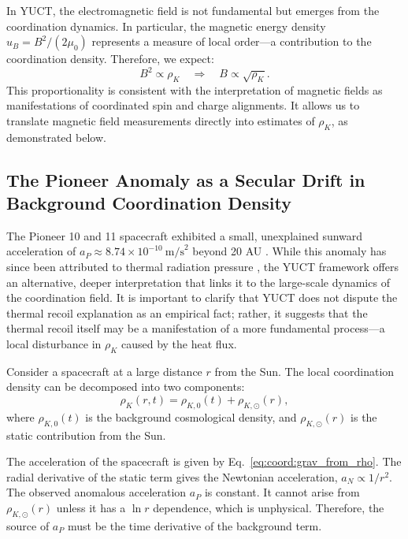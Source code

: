 \documentclass[12pt,a4paper]{article}
\theoremstyle{remark}
\begin{document}
	In YUCT, the electromagnetic field is not fundamental but emerges from the coordination dynamics. In particular, the magnetic energy density \(u_B = B^2/(2\mu_0)\) represents a measure of local order—a contribution to the coordination density. Therefore, we expect:
	\begin{equation}
		B^2 \propto \rho_K \quad \Longrightarrow \quad B \propto \sqrt{\rho_K}.
		\label{eq:coord:B_rho}
	\end{equation}
	This proportionality is consistent with the interpretation of magnetic fields as manifestations of coordinated spin and charge alignments. It allows us to translate magnetic field measurements directly into estimates of \(\rho_K\), as demonstrated below.
	
	\subsection{The Pioneer Anomaly as a Secular Drift in Background Coordination Density}
	\label{subsec:coord:pioneer}
	
	The Pioneer 10 and 11 spacecraft exhibited a small, unexplained sunward acceleration of \(a_P \approx 8.74 \times 10^{-10}\ \text{m/s}^2\) beyond 20 AU \cite{Anderson1998}. While this anomaly has since been attributed to thermal radiation pressure \cite{Turyshev2012}, the YUCT framework offers an alternative, deeper interpretation that links it to the large-scale dynamics of the coordination field. It is important to clarify that YUCT does not dispute the thermal recoil explanation as an empirical fact; rather, it suggests that the thermal recoil itself may be a manifestation of a more fundamental process—a local disturbance in \(\rho_K\) caused by the heat flux.
	
	Consider a spacecraft at a large distance \(r\) from the Sun. The local coordination density can be decomposed into two components:
	\begin{equation}
		\rho_K(r,t) = \rho_{K,0}(t) + \rho_{K,\odot}(r),
		\label{eq:coord:rho_decomp}
	\end{equation}
	where \(\rho_{K,0}(t)\) is the background cosmological density, and \(\rho_{K,\odot}(r)\) is the static contribution from the Sun.
	
	The acceleration of the spacecraft is given by Eq.~\eqref{eq:coord:grav_from_rho}. The radial derivative of the static term gives the Newtonian acceleration, \(a_N \propto 1/r^2\). The observed anomalous acceleration \(a_P\) is constant. It cannot arise from \(\rho_{K,\odot}(r)\) unless it has a \(\ln r\) dependence, which is unphysical. Therefore, the source of \(a_P\) must be the time derivative of the background term.
	
\end{document}
